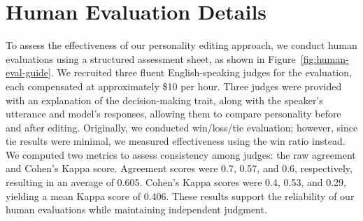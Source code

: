 \section{Human Evaluation Details}
\label{appendix:human_eval}

To assess the effectiveness of our personality editing approach, we conduct human evaluations using a structured assessment sheet, as shown in Figure~\ref{fig:human-eval-guide}. We recruited three fluent English-speaking judges for the evaluation, each compensated at approximately \$10 per hour. Three judges were provided with an explanation of the decision-making trait, along with the speaker's utterance and model's responses, allowing them to compare personality before and after editing. Originally, we conducted win/loss/tie evaluation; however, since tie results were minimal, we measured effectiveness using the win ratio instead. We computed two metrics to assess consistency among judges: the raw agreement and Cohen’s Kappa score. Agreement scores were 0.7, 0.57, and 0.6, respectively, resulting in an average of 0.605. Cohen’s Kappa scores were 0.4, 0.53, and 0.29, yielding a mean Kappa score of 0.406. These results support the reliability of our human evaluations while maintaining independent judgment.
